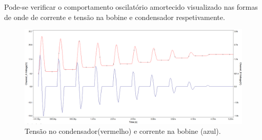 \documentclass[a4paper,11pt]{article}
\numberwithin{equation}{section}
\begin{document}
Pode-se verificar o comportamento oscilatório amortecido visualizado nas formas de onde de corrente e tensão na bobine e condensador respetivamente.

 \begin{figure}[h]
 	\centering
 	\includegraphics[keepaspectratio=true, scale=0.365]{img/sim/oscil}
 	\caption{Tensão no condensador(vermelho) e corrente na bobine (azul).}
 	\label{fig:conbobine}
 	\vspace{-0.8em}
 \end{figure}
\end{document}
